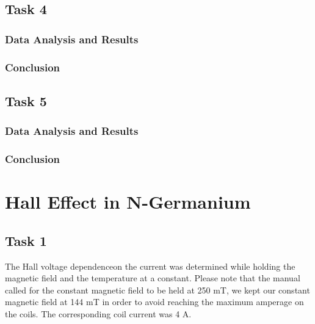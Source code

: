 \documentclass[a4paper]{article}
\begin{document}
\subsection{Task 4}

\subsubsection{Data Analysis and Results}

\subsubsection{Conclusion}

\subsection{Task 5}

\subsubsection{Data Analysis and Results}

\subsubsection{Conclusion}

\section{Hall Effect in N-Germanium}

\subsection{Task 1}

\qq The Hall voltage dependenceon the current was determined while
holding the magnetic field and the temperature at a constant. Please
note that the manual called for the constant magnetic field to be held
at 250 mT, we kept our constant magnetic field at 144 mT in order to
avoid reaching the maximum amperage on the coils. The corresponding
coil current was 4 A.
\end{document}
